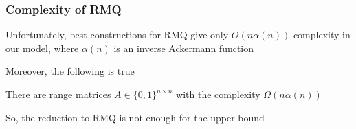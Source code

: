 \documentclass{beamer}
\begin{document}
\begin{frame}
\frametitle{Complexity of RMQ}

Unfortunately, best constructions for RMQ give only $O(n \alpha(n))$ complexity in our model, where $\alpha(n)$ is an inverse Ackermann function


\pause
\medskip
Moreover, the following is true
\begin{theorem}
There are range matrices $A\in \{0,1\}^{n\times n}$ with the complexity $\Omega(n \alpha(n))$
\end{theorem}

So, the reduction to RMQ is not enough for the upper bound


\end{frame}
\end{document}
